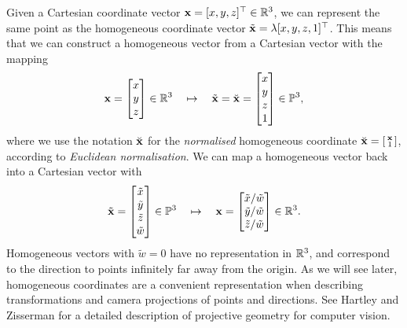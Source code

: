 Given a Cartesian coordinate vector ${\boldsymbol{\mathbf{x}}} = [x, y, z]^{\top} \in {\mathbb R}^3$, we can represent the same point as the homogeneous coordinate vector $\tilde{{\boldsymbol{\mathbf{x}}}} = \lambda[x, y, z, 1]^{\top}$.
This means that we can construct a homogeneous vector from a Cartesian vector with the mapping
\begin{equation} \label{eq:cart-to-homo}
  {\boldsymbol{\mathbf{x}}} = 
  \begin{bmatrix}
  x\\
  y\\
  z
  \end{bmatrix}
  \in {\mathbb R}^3
  \quad \mapsto \quad
  \tilde{{\boldsymbol{\mathbf{x}}}} = \breve{{\boldsymbol{\mathbf{x}}}} =
  \begin{bmatrix}
  x\\
  y\\
  z\\
  1
  \end{bmatrix}
  \in {\mathbb P}^3,
\end{equation}
where we use the notation $\breve{{\boldsymbol{\mathbf{x}}}}$ for the \emph{normalised} homogeneous coordinate $\breve{{\boldsymbol{\mathbf{x}}}} = \begin{bsmallmatrix}{\boldsymbol{\mathbf{x}}}\\ 1\end{bsmallmatrix}$, according to \emph{Euclidean normalisation}.
We can map a homogeneous vector back into a Cartesian vector with
\begin{equation} \label{eq:homo-to-cart}
  \tilde{{\boldsymbol{\mathbf{x}}}} =
  \begin{bmatrix}
  \tilde{x}\\
  \tilde{y}\\
  \tilde{z}\\
  \tilde{w}
  \end{bmatrix}
  \in {\mathbb P}^3
  \quad \mapsto \quad
  {\boldsymbol{\mathbf{x}}} = 
  \begin{bmatrix}
  \tilde{x} / \tilde{w}\\
  \tilde{y} / \tilde{w}\\
  \tilde{z} / \tilde{w}
  \end{bmatrix}
  \in {\mathbb R}^3.
\end{equation}
Homogeneous vectors with $\tilde{w} = 0$ have no representation in ${\mathbb R}^3$, and correspond to the direction to points infinitely far away from the origin.
As we will see later, homogeneous coordinates are a convenient representation when describing transformations and camera projections of points and directions.
See Hartley and Zisserman \cite{Hartley2004MultipleVision} for a detailed description of projective geometry for computer vision.

